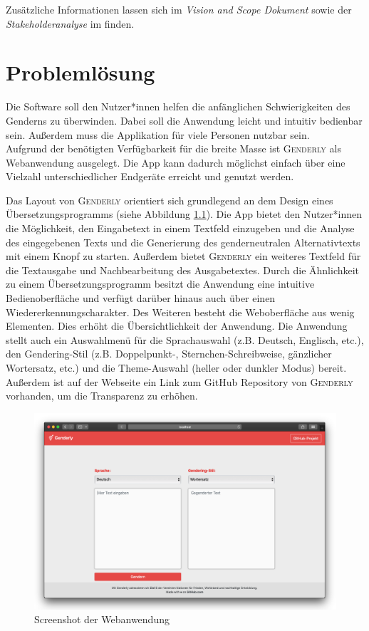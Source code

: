 \documentclass[paper=a4, parskip=half]{scrreprt}
\newcommand{\Genderly}{\textsc{Genderly }}
\begin{document}
Zusätzliche Informationen lassen sich im \textit{Vision and Scope Dokument} sowie der \textit{Stakeholderanalyse} im \textcolor{blue}{} finden.

\chapter{Problemlösung}

Die Software soll den Nutzer*innen helfen die anfänglichen Schwierigkeiten des Genderns zu überwinden. Dabei soll die Anwendung leicht und intuitiv bedienbar sein. Außerdem muss die Applikation für viele Personen nutzbar sein. \\
Aufgrund der benötigten Verfügbarkeit für die breite Masse ist \Genderly als Webanwendung ausgelegt. Die App kann dadurch möglichst einfach über eine Vielzahl unterschiedlicher Endgeräte erreicht und genutzt werden.

Das Layout von \Genderly{} orientiert sich grundlegend an dem Design eines Übersetzungsprogramms (siehe Abbildung \ref{fig:Screenshot}). Die App bietet den Nutzer*innen die Möglichkeit, den Eingabetext in einem Textfeld einzugeben und die Analyse des eingegebenen Texts und die Generierung des genderneutralen Alternativtexts mit einem Knopf zu starten. Außerdem bietet \Genderly ein weiteres Textfeld für die Textausgabe und Nachbearbeitung des Ausgabetextes. 
Durch die Ähnlichkeit zu einem Übersetzungsprogramm besitzt die Anwendung eine intuitive Bedienoberfläche und verfügt darüber hinaus auch über einen Wiedererkennungscharakter. Des Weiteren besteht die Weboberfläche aus wenig Elementen. Dies erhöht die Übersichtlichkeit der Anwendung.
Die Anwendung stellt auch ein Auswahlmenü für die Sprachauswahl (z.B. Deutsch, Englisch, etc.), den Gendering-Stil (z.B. Doppelpunkt-, Sternchen-Schreibweise, gänzlicher Wortersatz, etc.) und die Theme-Auswahl (heller oder dunkler Modus) bereit. Außerdem ist auf der Webseite ein Link zum GitHub Repository von \Genderly vorhanden, um die Transparenz zu erhöhen.


\begin{figure}[hbt!]
  \centering
  \includegraphics[scale=0.4]{Bilder/Genderly_Web.PNG}
  \vspace{-0.25cm}
  \caption[Screenshot der Webanwendung]{Screenshot der Webanwendung}
  \label{fig:Screenshot}
\end{figure}
\end{document}

